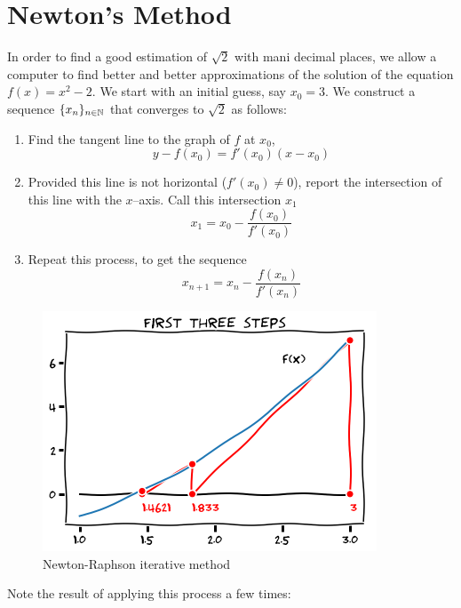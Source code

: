 
\section{Newton's Method}
\begin{example}
In order to find a good estimation of $\sqrt{2}$ with mani decimal places, we allow a computer to find better and better approximations of the solution of the equation $f(x)=x^2-2$.  We start with an initial guess, say $x_0=3$.  We construct a sequence $\{ x_n \}_{n\in\mathbb{N}}$ that converges to $\sqrt{2}$ as follows:
\begin{enumerate}
\item Find the tangent line to the graph of $f$ at $x_0$, 
\begin{equation*}
y-f(x_0)=f'(x_0)(x-x_0)
\end{equation*}
\item Provided this line is not horizontal ($f'(x_0)\neq 0$), report the intersection of this line with the $x$--axis.  Call this intersection $x_1$
\begin{equation*}
x_1=x_0-\frac{f(x_0)}{f'(x_0)}
\end{equation*}
\item Repeat this process, to get the sequence 
\begin{equation*}
x_{n+1} = x_n - \frac{f(x_n)}{f'(x_n)}
\end{equation*}
\end{enumerate}
\begin{figure}[ht!]
\includegraphics[width=0.65\linewidth]{newton1.png}
\caption{Newton-Raphson iterative method}
\label{figure:Newton-Raphson}
\end{figure}
Note the result of applying this process a few times:


\end{example}
